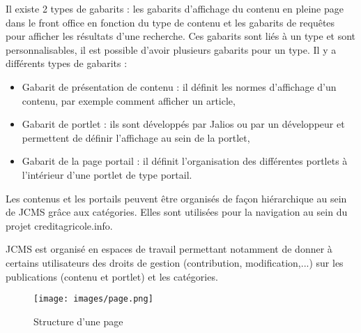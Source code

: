 \documentclass[12pt,a4paper]{article}
\begin{document}
Il existe 2 types de gabarits : les gabarits d'affichage du contenu en pleine page dans le front office en fonction du type de contenu et les gabarits de requêtes pour afficher les résultats d'une recherche. Ces gabarits sont liés à un type et sont personnalisables, il est possible d'avoir plusieurs gabarits pour un type. Il y a différents types de gabarits :
\begin{itemize}
\item Gabarit de présentation de contenu : il définit les normes d'affichage d'un contenu, par exemple comment afficher un article,
\item Gabarit de portlet : ils sont développés par Jalios ou par un développeur et permettent de définir l'affichage au sein de la portlet,
\item Gabarit de la page portail : il définit l'organisation des différentes portlets à l'intérieur d'une portlet de type portail.
\end{itemize}\par 
Les contenus et les portails peuvent être organisés de façon hiérarchique au sein de \gls{JCMS} grâce aux catégories. Elles sont utilisées pour la navigation au sein du projet creditagricole.info.\par
\gls{JCMS} est organisé en espaces de travail permettant notamment de donner à certains utilisateurs des droits de gestion (contribution, modification,...) sur les publications (contenu et portlet) et les catégories.\par 
\begin{figure}[h!]
\centering
\texttt{[image: images/page.png]}
\caption{Structure d'une page}
\end{figure}
\end{document}
